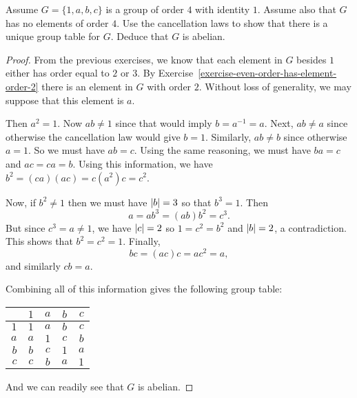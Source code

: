  Assume $G = \{1, a, b, c\}$ is a group of order $4$ with
identity $1$. Assume also that $G$ has no elements of order $4$. Use
the cancellation laws to show that there is a unique group table for
$G$. Deduce that $G$ is abelian.
\begin{proof}
  From the previous exercises, we know that each element in $G$
  besides $1$ either has order equal to $2$ or $3$. By
  Exercise~\ref{exercise-even-order-has-element-order-2} there is an
  element in $G$ with order $2$. Without loss of generality, we may
  suppose that this element is $a$.

  Then $a^2 = 1$. Now $ab\neq1$ since that would imply
  $b = a^{-1} = a$. Next, $ab\neq a$ since otherwise the cancellation
  law would give $b = 1$. Similarly, $ab\neq b$ since otherwise
  $a = 1$. So we must have $ab = c$. Using the same reasoning, we must
  have $ba = c$ and $ac = ca = b$. Using this information, we have
  $b^2 = (ca)(ac) = c(a^2)c = c^2$.

  Now, if $b^2\neq1$ then we must have $\lvert{b}\rvert = 3$ so that
  $b^3 = 1$. Then
  \begin{equation*}
    a = ab^3 = (ab)b^2 = c^3.
  \end{equation*}
  But since $c^3 = a\neq1$, we have $\lvert{c}\rvert = 2$ so $1 = c^2 = b^2$
  and $\lvert{b}\rvert = 2$, a contradiction. This shows that $b^2 = c^2 =
  1$. Finally,
  \begin{equation*}
    bc = (ac)c = ac^2 = a,
  \end{equation*}
  and similarly $cb = a$.

  Combining all of this information gives the following group table:
  \begin{center}
    \begin{tabular}{r|cccc}
      & $1$ & $a$ & $b$ & $c$ \\\hline
      $1$ & $1$ & $a$ & $b$ & $c$ \\
      $a$ & $a$ & $1$ & $c$ & $b$ \\
      $b$ & $b$ & $c$ & $1$ & $a$ \\
      $c$ & $c$ & $b$ & $a$ & $1$
    \end{tabular}
  \end{center}
  And we can readily see that $G$ is abelian.
\end{proof}
